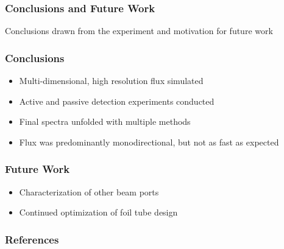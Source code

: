 \documentclass[fleqn]{beamer}
\begin{document}
\begin{frame}
\frametitle{Conclusions and Future Work}

Conclusions drawn from the experiment and motivation for future work

\end{frame}
\begin{frame}
\frametitle{Conclusions}
\begin{itemize}
\item Multi-dimensional, high resolution flux simulated
\item Active and passive detection experiments conducted
\item Final spectra unfolded with multiple methods
\item Flux was predominantly monodirectional, but not as fast as expected
\end{itemize}

\end{frame}

\begin{frame}
\frametitle{Future Work}
\begin{itemize}
\item Characterization of other beam ports
\item Continued optimization of foil tube design
\end{itemize}
\end{frame}

\begin{frame}[t,allowframebreaks]\label{lastframe}
\frametitle{References}

{\scriptsize
}
\end{frame}
\end{document}
